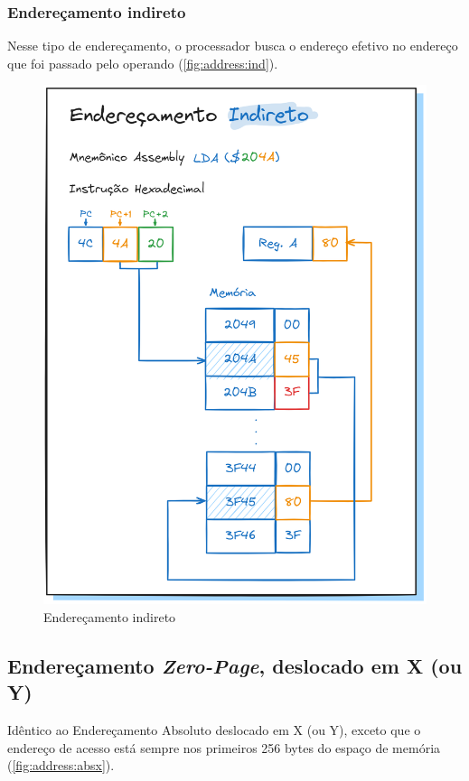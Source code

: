 \documentclass[
	12pt,				  %
	openright,		%
	a4paper,			%
	english,			%
	french,				%
	spanish,			%
	brazil,				%
]{abntex2}
\begin{document}
\subsubsection{Endereçamento indireto}
Nesse tipo de endereçamento, o processador busca o endereço efetivo no endereço
que foi passado pelo operando (\autoref{fig:address:ind}).
\begin{figure}[h]
	\centering
	\caption{Endereçamento indireto} \label{fig:address:ind}
	\includegraphics[scale=0.25]{../assets/img/addressing-modes-ind.png}
\end{figure}

\subsection{Endereçamento \emph{Zero-Page}, deslocado em X (ou Y)}
Idêntico ao Endereçamento Absoluto deslocado em X (ou Y), exceto que o endereço
de acesso está sempre nos primeiros 256 bytes do espaço de memória
(\autoref{fig:address:absx}).
\end{document}
